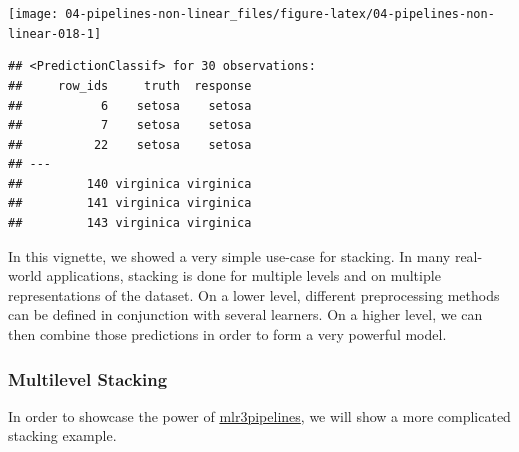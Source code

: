 \documentclass[
]{scrbook}
\newenvironment{Shaded}{\begin{snugshade}}{\end{snugshade}}
\newcommand{\AttributeTok}[1]{\textcolor[rgb]{0.77,0.63,0.00}{#1}}
\newcommand{\ConstantTok}[1]{\textcolor[rgb]{0.00,0.00,0.00}{#1}}
\newcommand{\FunctionTok}[1]{\textcolor[rgb]{0.00,0.00,0.00}{#1}}
\newcommand{\NormalTok}[1]{#1}
\newcommand{\OtherTok}[1]{\textcolor[rgb]{0.56,0.35,0.01}{#1}}
\newcommand{\SpecialCharTok}[1]{\textcolor[rgb]{0.00,0.00,0.00}{#1}}
\newcommand{\StringTok}[1]{\textcolor[rgb]{0.31,0.60,0.02}{#1}}
\renewenvironment{Shaded} {\begin{snugshade}\small} {\end{snugshade}}
\begin{document}
\begin{Shaded}
\end{Shaded}

\begin{center}\texttt{[image: 04-pipelines-non-linear\_files/figure-latex/04-pipelines-non-linear-018-1]} \end{center}

\begin{Shaded}
\end{Shaded}

\begin{verbatim}
## <PredictionClassif> for 30 observations:
##     row_ids     truth  response
##           6    setosa    setosa
##           7    setosa    setosa
##          22    setosa    setosa
## ---                            
##         140 virginica virginica
##         141 virginica virginica
##         143 virginica virginica
\end{verbatim}

In this vignette, we showed a very simple use-case for stacking.
In many real-world applications, stacking is done for multiple levels and on multiple representations of the dataset.
On a lower level, different preprocessing methods can be defined in conjunction with several learners.
On a higher level, we can then combine those predictions in order to form a very powerful model.

\hypertarget{multilevel-stacking}{%
\subsubsection{Multilevel Stacking}\label{multilevel-stacking}}

In order to showcase the power of \href{https://mlr3pipelines.mlr-org.com}{mlr3pipelines}, we will show a more complicated stacking example.
\end{document}
